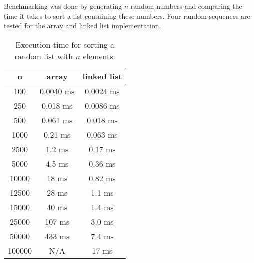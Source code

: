 \documentclass[a4paper,11pt]{article}
\begin{document}
Benchmarking was done by generating $n$ random numbers and comparing the time it takes to sort a list containing these numbers. Four random sequences are tested for the array and linked list implementation.

\begin{table}[H]
\centering
\begin{tabular}{|c|c|c|}
\hline
\textbf{n} & \textbf{array} & \textbf{linked list} \\
\hline
	100 & 0.0040 ms & 0.0024 ms  \\
	250 & 0.018 ms & 0.0086 ms  \\
	500 & 0.061 ms & 0.018 ms  \\
	1000 & 0.21 ms & 0.063 ms  \\
	2500 & 1.2 ms & 0.17 ms  \\
	5000 & 4.5 ms & 0.36 ms  \\
	10000 & 18 ms & 0.82 ms  \\
	12500 & 28 ms & 1.1 ms  \\
	15000 & 40 ms & 1.4 ms  \\
	25000 & 107 ms & 3.0 ms \\
	50000 & 433 ms & 7.4 ms \\
	100000 & N/A & 17 ms \\
\hline
\end{tabular}
\caption{Execution time for sorting a random list with $n$ elements.}
\label{tab:table1}
\end{table}

\begin{table}[H]
\centering
{}
\end{table}

\begin{table}[H]
\centering
{}
\end{table}
\end{document}
